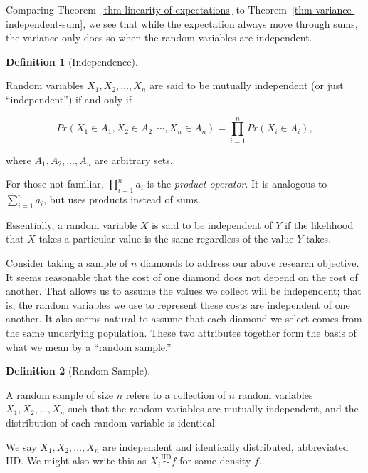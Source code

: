 \documentclass[
  letterpaper,
  DIV=11,
  numbers=noendperiod]{scrreprt}
\theoremstyle{plain}
\theoremstyle{definition}
\newtheorem{definition}{Definition}[chapter]
\theoremstyle{definition}
\theoremstyle{remark}
\begin{document}
Comparing Theorem~\ref{thm-linearity-of-expectations} to
Theorem~\ref{thm-variance-independent-sum}, we see that while the
expectation always move through sums, the variance only does so when the
random variables are independent.

\begin{definition}[Independence]\protect\hypertarget{def-independence}{}\label{def-independence}

Random variables \(X_1, X_2, \dotsc, X_n\) are said to be mutually
independent (or just ``independent'') if and only if

\[Pr\left(X_1 \in A_1, X_2 \in A_2, \dotsb, X_n \in A_n\right) = \prod_{i=1}^{n} Pr\left(X_i \in A_i\right),\]

where \(A_1, A_2, \dotsc, A_n\) are arbitrary sets.

\end{definition}

\begin{tcolorbox}[enhanced jigsaw, toprule=.15mm, left=2mm, title=\textcolor{quarto-callout-note-color}{\faInfo}\hspace{0.5em}{Note}, opacityback=0, toptitle=1mm, leftrule=.75mm, colbacktitle=quarto-callout-note-color!10!white, opacitybacktitle=0.6, titlerule=0mm, breakable, colframe=quarto-callout-note-color-frame, arc=.35mm, coltitle=black, bottomtitle=1mm, rightrule=.15mm, colback=white, bottomrule=.15mm]

For those not familiar, \(\prod_{i=1}^n a_i\) is the \emph{product
operator}. It is analogous to \(\sum_{i=1}^{n} a_i\), but uses products
instead of sums.

\end{tcolorbox}

Essentially, a random variable \(X\) is said to be independent of \(Y\)
if the likelihood that \(X\) takes a particular value is the same
regardless of the value \(Y\) takes.

Consider taking a sample of \(n\) diamonds to address our above research
objective. It seems reasonable that the cost of one diamond does not
depend on the cost of another. That allows us to assume the values we
collect will be independent; that is, the random variables we use to
represent these costs are independent of one another. It also seems
natural to assume that each diamond we select comes from the same
underlying population. These two attributes together form the basis of
what we mean by a ``random sample.''

\begin{definition}[Random
Sample]\protect\hypertarget{def-random-sample}{}\label{def-random-sample}

A random sample of size \(n\) refers to a collection of \(n\) random
variables \(X_1, X_2, \dotsc, X_n\) such that the random variables are
mutually independent, and the distribution of each random variable is
identical.

We say \(X_1, X_2, \dotsc, X_n\) are independent and identically
distributed, abbreviated IID. We might also write this as
\(X_i \stackrel{\text{IID}}{\sim} f\) for some density \(f\).

\end{definition}
\end{document}
